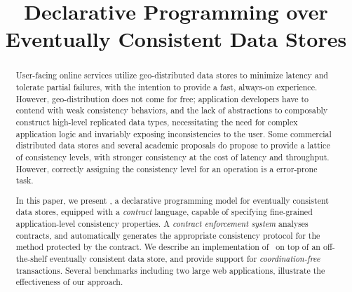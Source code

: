 \documentclass[pldi,nocopyrightspace]{sigplanconf}
\begin{document}
%
%

\title{Declarative Programming over Eventually Consistent Data Stores }

\maketitle
\begin{abstract}
User-facing online services utilize geo-distributed data stores to minimize
latency and tolerate partial failures, with the intention to provide a fast,
always-on experience. However, geo-distribution does not come for free;
application developers have to contend with weak consistency behaviors, and
the lack of abstractions to composably construct high-level replicated data
types, necessitating the need for complex application logic and invariably
exposing inconsistencies to the user. Some commercial distributed data
stores and several academic proposals do propose to provide a lattice of
consistency levels, with stronger consistency at the cost of latency and
throughput. However, correctly assigning the consistency level for an
operation is a error-prone task.

In this paper, we present \name, a declarative programming model for
eventually consistent data stores, equipped with a \emph{contract} language,
capable of specifying fine-grained application-level consistency
properties. A \emph{contract enforcement system} analyses contracts, and
automatically generates the appropriate consistency protocol for the method
protected by the contract. We describe an implementation of \name\ on top of
an off-the-shelf eventually consistent data store, and provide support for
\emph{coordination-free} transactions. Several benchmarks including two
large web applications, illustrate the effectiveness of our approach.
\end{abstract}






















\small

\end{document}
